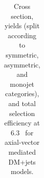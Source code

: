 \begin{table}
{\begin{tabular}{rrlrrrrr}
    \hline\hline
    \end{tabular}
    }
    \caption{Cross section, yields (split according to symmetric, asymmetric, 
        and monojet categories), and total selection efficiency at $6.3$~\ifb 
        for axial-vector mediated DM+jets models.}
    \label{tab:DMAV_yld}
\end{table}

